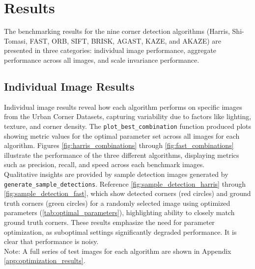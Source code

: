 \documentclass[journal]{IEEEtran}
\begin{document}
\section{Results}
\label{section:results}

The benchmarking results for the nine corner detection algorithms (Harris, Shi-Tomasi, FAST, ORB, SIFT, BRISK, AGAST, KAZE, and AKAZE) are presented in three categories: individual image performance, aggregate performance across all images, and scale invariance performance.

\subsection{Individual Image Results}
Individual image results reveal how each algorithm performs on specific images from the Urban Corner Datasets, capturing variability due to factors like lighting, texture, and corner density. The \texttt{plot\_best\_combination} function produced plots showing metric values for the optimal parameter set across all images for each algorithm. Figures \ref{fig:harris_combinations} through \ref{fig:fast_combinations} illustrate the performance of the three different algorithms, displaying metrics such as precision, recall, and speed across each benchmark images.\\

Qualitative insights are provided by sample detection images generated by \texttt{generate\_sample\_detections}. Reference \cref{fig:sample_detection_harris} through \cref{fig:sample_detection_fast}, which show detected corners (red circles) and ground truth corners (green circles) for a randomly selected image using optimized parameters (\cref{tab:optimal_parameters}), highlighting ability to closely match ground truth corners. These results emphasize the need for parameter optimization, as suboptimal settings significantly degraded performance. It is clear that performance is noisy.\\

Note: A full series of test images for each algorithm are shown in Appendix \ref{app:optimization_results}.
\end{document}
